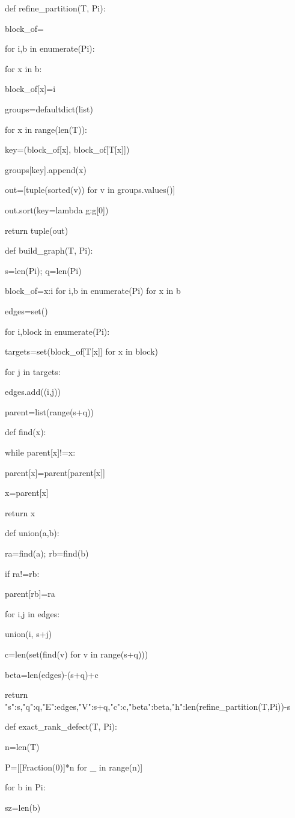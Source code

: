 def refine_partition(T, Pi):

block_of={}

for i,b in enumerate(Pi):

for x in b:

block_of[x]=i

groups=defaultdict(list)

for x in range(len(T)):

key=(block_of[x], block_of[T[x]])

groups[key].append(x)

out=[tuple(sorted(v)) for v in groups.values()]

out.sort(key=lambda g:g[0])

return tuple(out)


def build_graph(T, Pi):

s=len(Pi); q=len(Pi)

block_of={x:i for i,b in enumerate(Pi) for x in b}

edges=set()

for i,block in enumerate(Pi):

targets=set(block_of[T[x]] for x in block)

for j in targets:

edges.add((i,j))

parent=list(range(s+q))

def find(x):

while parent[x]!=x:

parent[x]=parent[parent[x]]

x=parent[x]

return x

def union(a,b):

ra=find(a); rb=find(b)

if ra!=rb:

parent[rb]=ra

for i,j in edges:

union(i, s+j)

c=len(set(find(v) for v in range(s+q)))

beta=len(edges)-(s+q)+c

return {"s":s,"q":q,"E":edges,"V":s+q,"c":c,"beta":beta,"h":len(refine_partition(T,Pi))-s}


def exact_rank_defect(T, Pi):

n=len(T)

P=[[Fraction(0)]*n for _ in range(n)]

for b in Pi:

sz=len(b)

